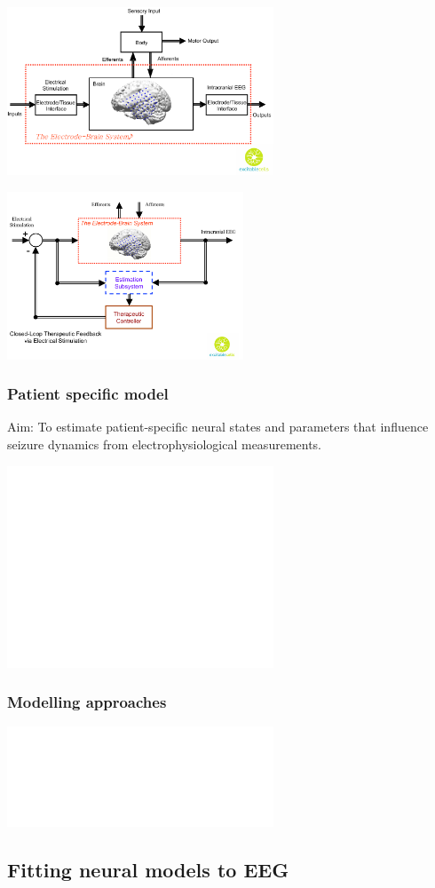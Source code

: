 \documentclass[compress]{beamer}
\begin{document}
\begin{frame}
	\begin{center}
		\includegraphics[height=5cm]{./Figures/BodyBrainElectrodeSystem.pdf}	
	\end{center}	
\end{frame}

\begin{frame}
	\begin{center}
		\includegraphics[height=5cm]{./Figures/StimulationSeizureControl.pdf}	
	\end{center}	
\end{frame}

\begin{frame}\frametitle{Patient specific model}
	Aim: To estimate patient-specific neural states and parameters that influence seizure dynamics from electrophysiological measurements. 
	\begin{center}
		\includegraphics<1>[height=6cm]{./Figures/BrainElectrode.pdf} 
	\end{center}
\end{frame}

\begin{frame}\frametitle{Modelling approaches} 
	\begin{center}
		\includegraphics<1>[height=3cm]{./Figures/ModellingApproaches.pdf} 
	\end{center}
\end{frame}
\subsection{Fitting neural models to EEG}
\end{document}
